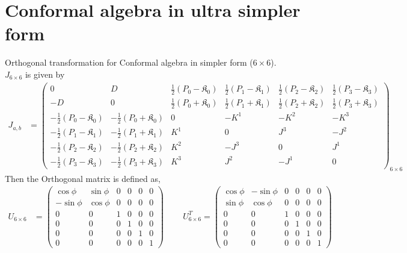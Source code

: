\documentclass[]{article}
\numberwithin{equation}{section}
\begin{document}
{{\section{Conformal algebra in ultra simpler form}
Orthogonal transformation for Conformal algebra in simpler form ($6\times6$).\\
$J_{6\times6}$ is given by
\begin{align}
  J_{a,b}&=
  \begin{pmatrix}
  0&D&\frac{1}{2}(P_{0}-\mathfrak{K}_{0})&\frac{1}{2}(P_{1}-\mathfrak{K}_{1})&\frac{1}{2}(P_{2}-\mathfrak{K}_{2})&\frac{1}{2}(P_{3}-\mathfrak{K}_{3})\\
  -D&0&\frac{1}{2}(P_{0}+\mathfrak{K}_{0})&\frac{1}{2}(P_{1}+\mathfrak{K}_{1})&\frac{1}{2}(P_{2}+\mathfrak{K}_{2})&\frac{1}{2}(P_{3}+\mathfrak{K}_{3})\\
    -\frac{1}{2}(P_{0}-\mathfrak{K}_{0})&-\frac{1}{2}(P_{0}+\mathfrak{K}_{0})&0 & -K^{1} & -K^{2} & -K^{3}\\
    -\frac{1}{2}(P_{1}-\mathfrak{K}_{1})&-\frac{1}{2}(P_{1}+\mathfrak{K}_{1})&K^{1} & 0 & J^{3} & -J^{2}\\
    -\frac{1}{2}(P_{2}-\mathfrak{K}_{2})&-\frac{1}{2}(P_{2}+\mathfrak{K}_{2})&K^{2} & -J^{3} & 0 & J^{1}\\
    -\frac{1}{2}(P_{3}-\mathfrak{K}_{3})&-\frac{1}{2}(P_{3}+\mathfrak{K}_{3})&K^{3} & J^{2} & -J^{1} & 0
  \end{pmatrix}_{6\times6}
\end{align}
Then the Orthogonal matrix is defined as,
\begin{align}
  U_{6\times6}&=
  \begin{pmatrix}
  \cos{\phi}&\sin{\phi}&0&0&0&0\\
  -\sin{\phi}&\cos{\phi}&0&0&0&0\\
    0&0&1&0&0&0\\
    0&0&0&1&0&0\\
    0&0&0&0&1&0\\
    0&0&0&0&0&1
  \end{pmatrix}~~~~~~~~~~U^{T}_{6\times6}=
  \begin{pmatrix}
  \cos{\phi}&-\sin{\phi}&0&0&0&0\\
  \sin{\phi}&\cos{\phi}&0&0&0&0\\
    0&0&1&0&0&0\\
    0&0&0&1&0&0\\
    0&0&0&0&1&0\\
    0&0&0&0&0&1
  \end{pmatrix}~~~~~~~~~~
\end{align}
}}
\end{document}

